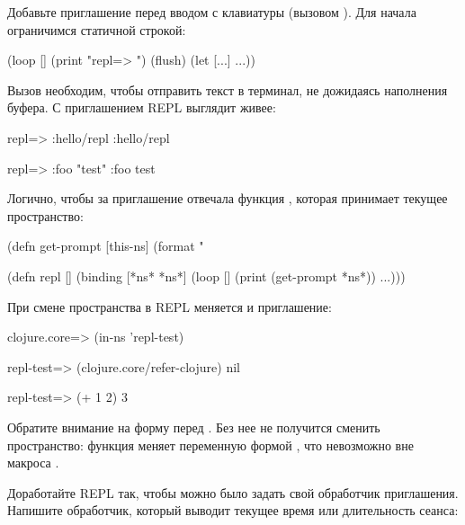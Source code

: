 Добавьте приглашение перед вводом с клавиатуры (вызовом ). Для начала ограничимся статичной строкой:

\begin{english}
  \begin{clojure}
(loop []
  (print "repl=> ")
  (flush)
  (let [...]
    ...))
  \end{clojure}
\end{english}

Вызов  необходим, чтобы отправить текст в терминал, не дожидаясь наполнения буфера. С приглашением REPL выглядит живее:

\begin{english}
  \begin{clojure}
repl=> :hello/repl
:hello/repl

repl=> {:foo "test"}
{:foo test}
  \end{clojure}
\end{english}

Логично, чтобы за приглашение отвечала функция , которая принимает текущее пространство:

\begin{english}
  \begin{clojure}
(defn get-prompt [this-ns]
  (format "%

(defn repl []
  (binding [*ns* *ns*]
    (loop []
      (print (get-prompt *ns*))
      ...)))
  \end{clojure}
\end{english}

При смене пространства в REPL меняется и приглашение:

\begin{english}
  \begin{clojure}
clojure.core=> (in-ns 'repl-test)

repl-test=> (clojure.core/refer-clojure)
nil

repl-test=> (+ 1 2)
3
  \end{clojure}
\end{english}

Обратите внимание на форму  перед . Без нее не получится сменить пространство: функция  меняет переменную  формой , что невозможно вне макроса .

Доработайте REPL так, чтобы можно было задать свой обработчик приглашения. Напишите обработчик, который выводит текущее время или длительность сеанса:

